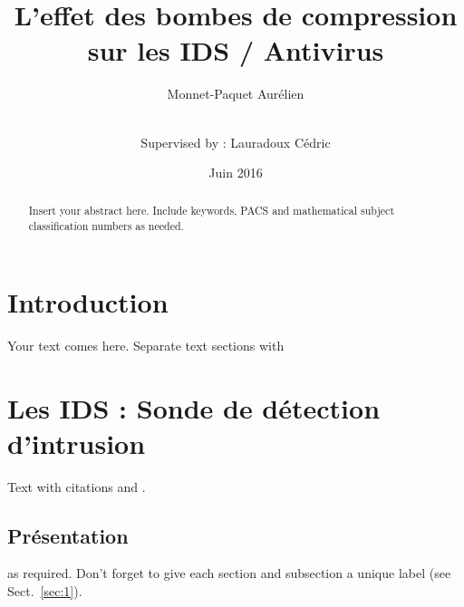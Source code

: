 \documentclass[smallextended]{svjour3}       %
\begin{document}
\title{L'effet des bombes de compression sur les IDS / Antivirus}


\author{Monnet-Paquet Aurélien  \\ \and \\
        Supervised by : Lauradoux Cédric
}



\date{Juin 2016}


\maketitle

\begin{abstract}
Insert your abstract here. Include keywords, PACS and mathematical
subject classification numbers as needed.
\end{abstract}

\section{Introduction}
\label{intro}
Your text comes here. Separate text sections with

\newpage
\section{Les IDS : Sonde de détection d'intrusion}
\label{sec1:ids}
Text with citations \cite{Suricata} and \cite{virustotal}.

\subsection{Présentation}
\label{ids:présentation}
as required. Don't forget to give each section
and subsection a unique label (see Sect.~\ref{sec:1}).
\end{document}
